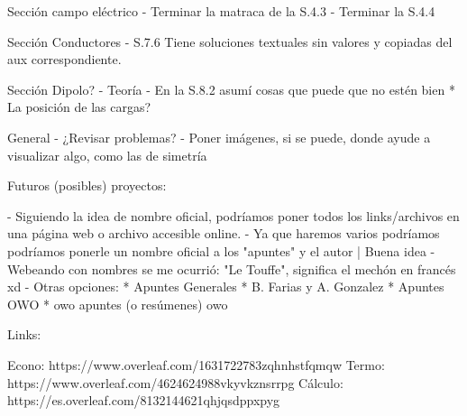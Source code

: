 Sección campo eléctrico
- Terminar la matraca de la S.4.3
- Terminar la S.4.4


Sección Conductores
- S.7.6 Tiene soluciones textuales sin valores y copiadas del aux correspondiente. 


Sección Dipolo?
- Teoría
- En la S.8.2 asumí cosas que puede que no estén bien
    * La posición de las cargas? 

General
- ¿Revisar problemas?
- Poner imágenes, si se puede, donde ayude a visualizar algo, como las de simetría



Futuros (posibles) proyectos:

- Siguiendo la idea de nombre oficial, podríamos poner todos los links/archivos en una página web o archivo accesible online. %
- Ya que haremos varios podríamos podríamos ponerle un nombre oficial a los "apuntes" y el autor | Buena idea
    - Webeando con nombres se me ocurrió: "Le Touffe", significa el mechón en francés xd
    - Otras opciones: * Apuntes Generales
                      * B. Farias y A. Gonzalez
                      * Apuntes OWO
                      * owo apuntes (o resúmenes) owo


Links:

Econo: https://www.overleaf.com/1631722783zqhnhstfqmqw
Termo: https://www.overleaf.com/4624624988vkyvkznsrrpg
Cálculo: https://es.overleaf.com/8132144621qhjqsdppxpyg

